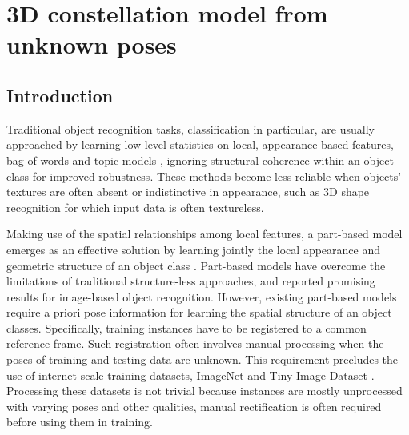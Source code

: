 \chapter{3D constellation model from unknown poses}
\label{chap/reg}

\section{Introduction}
\label{sec/reg/intro}

Traditional object recognition tasks, classification in particular, are usually approached by learning low level statistics on local, appearance based features, \eg bag-of-words \cite{Sivic2005, Fei-Fei2005} and topic models \cite{Fergus2005}, ignoring structural coherence within an object class for improved robustness. These methods become less reliable when objects' textures are often absent or indistinctive in appearance, such as 3D shape recognition for which input data is often textureless. 

Making use of the spatial relationships among local features, a part-based model emerges as an effective solution by learning jointly the local appearance and geometric structure of an object class \cite{Weber2000, Felzenszwalb2005, Fergus2007}. 
Part-based models have overcome the limitations of traditional structure-less approaches, and reported promising results for image-based object recognition. 
However, existing part-based models require a priori pose information for learning the spatial structure of an object classes. 
Specifically, training instances have to be registered to a common reference frame. Such registration often involves manual processing when the poses of training and testing data are unknown. This requirement precludes the use of internet-scale training datasets, \eg ImageNet \cite{Deng2009} and Tiny Image Dataset \cite{Torralba2008}. Processing these datasets is not trivial because instances are mostly unprocessed with varying poses and other qualities, manual rectification is often required before using them in training. 

